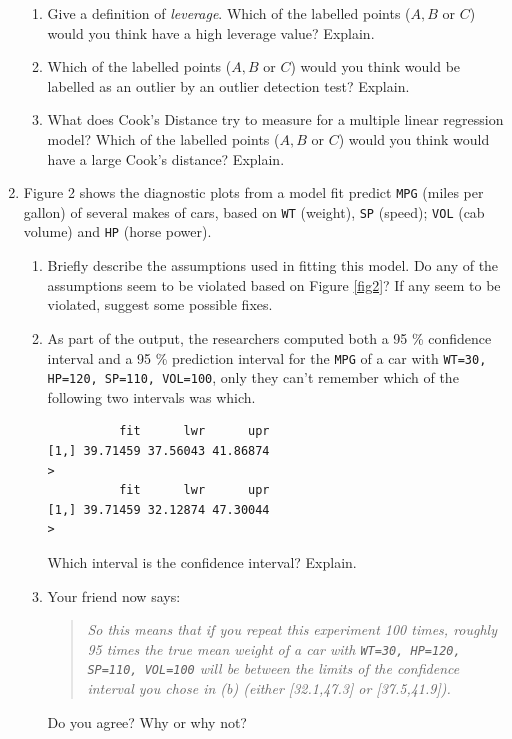 \documentclass{article}
\begin{document}
\begin{enumerate}
  \begin{enumerate}
  \item Give a definition of {\em leverage}. 
Which of the labelled points ($A, B$ or $C$)
would you think have a high leverage value? Explain.

\item Which of the labelled points ($A, B$ or $C$)
would you think would be labelled as an outlier by an outlier detection test? Explain.

\item What does Cook's Distance try to measure for a multiple linear regression model? Which of the labelled points ($A, B$ or $C$)
would you think would have a large Cook's distance? Explain.
  \end{enumerate}


\newpage 

\item Figure 2 shows the diagnostic plots from a model
fit predict {\tt MPG} (miles per gallon) of several makes of cars, based on {\tt WT} (weight), {\tt SP} (speed); {\tt VOL} (cab volume) and {\tt HP} (horse power).

  \begin{enumerate}
  \item Briefly describe the assumptions used in fitting this model. Do any of the assumptions seem to be violated based on Figure \ref{fig2}?
If any seem to be violated, suggest some possible fixes.


\item As part of the output, the researchers computed both a 95 \% confidence interval and a 95 \% prediction interval for the {\tt MPG} of a car with {\tt WT=30, HP=120, SP=110, VOL=100}, only they can't remember which of the following two intervals was which.
\begin{verbatim}
          fit      lwr      upr
[1,] 39.71459 37.56043 41.86874
>
          fit      lwr      upr
[1,] 39.71459 32.12874 47.30044
> 
\end{verbatim}
Which interval is the confidence interval? Explain.

\item Your friend now says:
  \begin{quote}
    {\em So this means that if you repeat this experiment
100 times, roughly 95 times the true mean weight of a car
with {\tt WT=30, HP=120, SP=110, VOL=100} will be between the limits
of the confidence interval you chose in (b) (either [32.1,47.3] or [37.5,41.9]).}
  \end{quote}
Do you agree? Why or why not?


\end{enumerate}
\end{enumerate}
\end{document}
